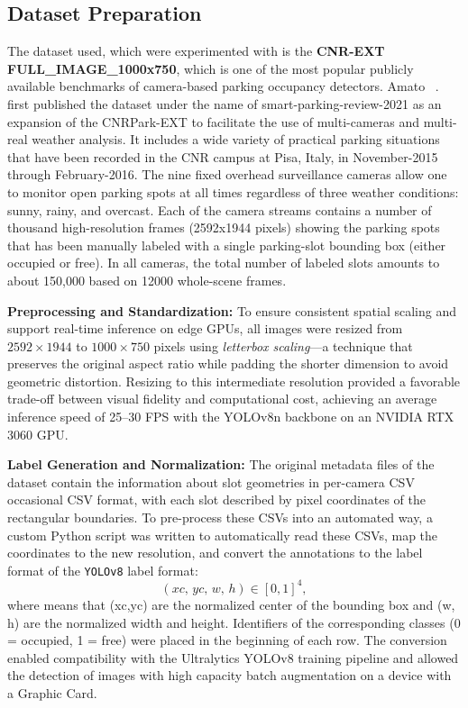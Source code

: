 \documentclass[conference]{IEEEtran}
\begin{document}
\subsection{Dataset Preparation}
The dataset used, which were experimented with is the \textbf{CNR-EXT FULL\_IMAGE\_1000x750}, which is one of the most popular publicly available benchmarks of camera-based parking occupancy detectors. Amato ~\cite{smartparking_review_2021}. first published the dataset under the name of smart-parking-review-2021 as an expansion of the CNRPark-EXT to facilitate the use of multi-cameras and multi-real weather analysis. It includes a wide variety of practical parking situations that have been recorded in the CNR campus at Pisa, Italy, in November-2015 through February-2016. The nine fixed overhead surveillance cameras allow one to monitor open parking spots at all times regardless of three weather conditions: sunny, rainy, and overcast. Each of the camera streams contains a number of thousand high-resolution frames (2592x1944 pixels) showing the parking spots that has been manually labeled with a single parking-slot bounding box (either occupied or free). In all cameras, the total number of labeled slots amounts to about 150,000 based on 12000 whole-scene frames.

\vspace{0.3em}
\noindent\textbf{Preprocessing and Standardization:}
To ensure consistent spatial scaling and support real-time inference on edge GPUs, all images were resized from $2592\times1944$ to $1000\times750$ pixels using \textit{letterbox scaling}—a technique that preserves the original aspect ratio while padding the shorter dimension to avoid geometric distortion. Resizing to this intermediate resolution provided a favorable trade-off between visual fidelity and computational cost, achieving an average inference speed of 25–30 FPS with the YOLOv8n backbone on an NVIDIA RTX 3060 GPU.

\vspace{0.3em}
\noindent\textbf{Label Generation and Normalization:}
The original metadata files of the dataset contain the information about slot geometries in per-camera CSV occasional CSV format, with each slot described by pixel coordinates of the rectangular boundaries. To pre-process these CSVs into an automated way, a custom Python script was written to automatically read these CSVs, map the coordinates to the new resolution, and convert the annotations to the label format of the \texttt{YOLOv8} label format:
\[
(xc,\,yc,\,w,\,h) \in [0,1]^4,
\]
where means that (xc,yc) are the normalized center of the bounding box and (w, h) are the normalized width and height. Identifiers of the corresponding classes (0 = occupied, 1 = free) were placed in the beginning of each row. The conversion enabled compatibility with the Ultralytics YOLOv8 training pipeline and allowed the detection of images with high capacity batch augmentation on a device with a Graphic Card.
\end{document}
